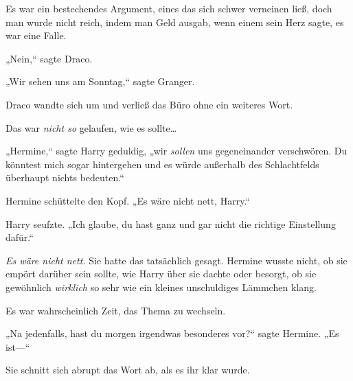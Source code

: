 Es war ein bestechendes Argument, eines das sich schwer verneinen ließ, doch man wurde nicht reich, indem man Geld ausgab, wenn einem sein Herz sagte, es war eine Falle.

„Nein,“ sagte Draco.

„Wir sehen uns am Sonntag,“ sagte Granger.

Draco wandte sich um und verließ das Büro ohne ein weiteres Wort.

Das war \emph{nicht so} gelaufen, wie es sollte…

\later

„Hermine,“ sagte Harry geduldig, „wir \emph{sollen} uns gegeneinander verschwören. Du könntest mich sogar hintergehen und es würde außerhalb des Schlachtfelds überhaupt nichts bedeuten.“

Hermine schüttelte den Kopf. „Es wäre nicht nett, Harry.“

Harry seufzte. „Ich glaube, du hast ganz und gar nicht die richtige Einstellung dafür.“

\emph{Es wäre nicht nett.} Sie hatte das tatsächlich gesagt. Hermine wusste nicht, ob sie empört darüber sein sollte, wie Harry über sie dachte oder besorgt, ob sie gewöhnlich \emph{wirklich} so sehr wie ein kleines unschuldiges Lämmchen klang.

Es war wahrscheinlich Zeit, das Thema zu wechseln.

„Na jedenfalls, hast du morgen irgendwas besonderes vor?“ sagte Hermine. „Es ist—“

Sie schnitt sich abrupt das Wort ab, als es ihr klar wurde.

